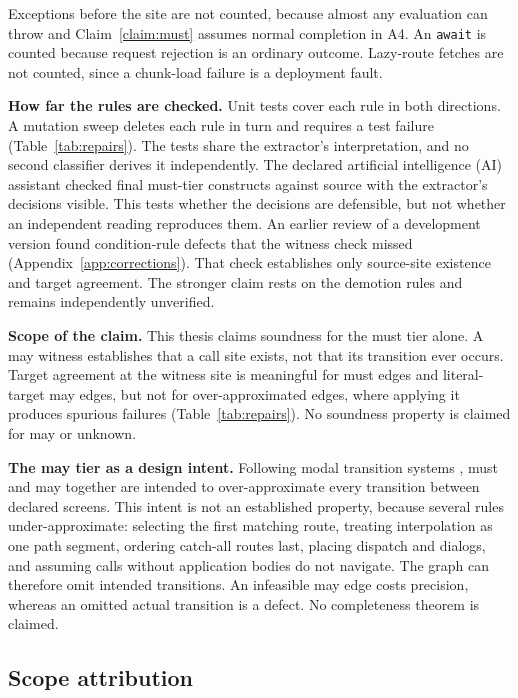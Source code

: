 Exceptions before the site are not counted, because almost any evaluation can throw and
Claim~\ref{claim:must} assumes normal completion in A4. An \texttt{await} is counted because request
rejection is an ordinary outcome. Lazy-route fetches are not counted, since a chunk-load failure is
a deployment fault.

\textbf{How far the rules are checked.} Unit tests cover each rule in both directions. A
mutation sweep deletes each rule in turn and requires a test failure
(Table~\ref{tab:repairs}). The tests share the extractor's interpretation, and no second
classifier derives it independently. The declared artificial intelligence (AI) assistant checked final must-tier
constructs against source with the extractor's decisions visible. This tests whether the
decisions are defensible, but not whether an independent reading reproduces them. An earlier review of a development version found condition-rule
defects that the witness check missed (Appendix~\ref{app:corrections}). That check establishes only source-site existence and target agreement. The stronger claim rests on the demotion rules
and remains independently unverified.

\textbf{Scope of the claim.} This thesis claims soundness for the must tier alone. A may witness establishes that a call site exists, not that its
transition ever occurs. Target agreement at the witness site is meaningful for must
edges and literal-target may edges, but not for over-approximated edges, where applying it produces spurious failures (Table~\ref{tab:repairs}). No soundness property is claimed for may or unknown.

\textbf{The may tier as a design intent.} Following modal transition systems
\cite{larsen1988modal}, must and may together are intended to over-approximate every
transition between declared screens. This intent is not an established property, because several
rules under-approximate: selecting the first matching route, treating interpolation as one
path segment, ordering catch-all routes last, placing dispatch and dialogs, and assuming
calls without application bodies do not navigate. The graph can therefore omit intended
transitions. An infeasible may edge costs precision, whereas an omitted actual transition is a
defect. No completeness theorem is claimed.

\subsection{Scope attribution}
\label{sec:attribution}


